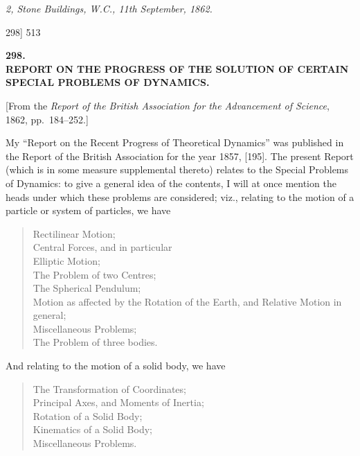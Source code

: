 \documentclass[11pt]{article}
\begin{document}
\medskip
\noindent\emph{2, Stone Buildings, W.C., 11th September, 1862.}

\newpage
\begin{center}
298] \hfill\hfill 513
\end{center}

\bigskip
\begin{center}
\textbf{\large 298.}\\[1ex]
\textbf{REPORT ON THE PROGRESS OF THE SOLUTION OF CERTAIN\\ SPECIAL PROBLEMS OF DYNAMICS.}
\end{center}

\begin{center}\small
[From the \emph{Report of the British Association for the Advancement of Science}, 1862, pp.\ 184--252.]
\end{center}

\medskip

My ``Report on the Recent Progress of Theoretical Dynamics'' was published in the Report of the British Association for the year 1857, [195]. The present Report (which is in some measure supplemental thereto) relates to the Special Problems of Dynamics: to give a general idea of the contents, I will at once mention the heads under which these problems are considered; viz., relating to the motion of a particle or system of particles, we have
\begin{quote}
Rectilinear Motion;\\
Central Forces, and in particular\\
Elliptic Motion;\\
The Problem of two Centres;\\
The Spherical Pendulum;\\
Motion as affected by the Rotation of the Earth, and Relative Motion in general;\\
Miscellaneous Problems;\\
The Problem of three bodies.
\end{quote}

And relating to the motion of a solid body, we have
\begin{quote}
The Transformation of Coordinates;\\
Principal Axes, and Moments of Inertia;\\
Rotation of a Solid Body;\\
Kinematics of a Solid Body;\\
Miscellaneous Problems.
\end{quote}
\end{document}
